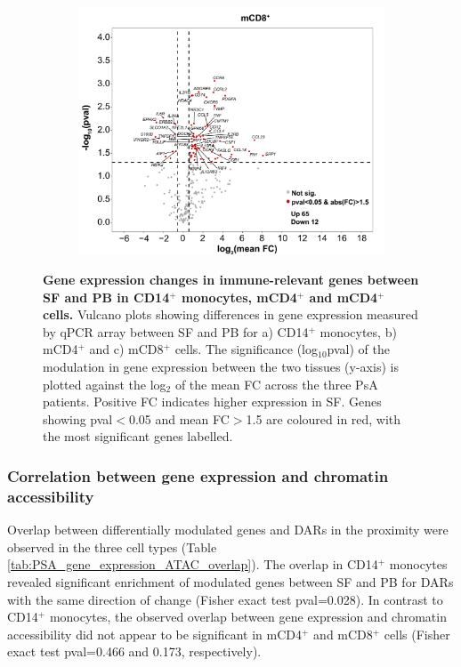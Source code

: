 \begin{figure}[htbp]
\begin{subfigure}{0.5\textwidth}
\caption{\textbf{}}
\end{subfigure} %
\begin{subfigure}{0.5\textwidth}
\centering
\includegraphics[width=\textwidth]{./Results3/pdfs/PSA_CD8_vulcano_plot_PCR_array_mean_FC}
\caption{\textbf{}}
\end{subfigure}
\caption[Gene expression changes in immune-relevant genes between SF and PB in CD14$^+$ monocytes, mCD4$^+$ and mCD8$^+$ cells.]{\textbf{Gene expression changes in immune-relevant genes between SF and PB in CD14$^+$ monocytes, mCD4$^+$ and mCD4$^+$ cells.} Vulcano plots showing differences in gene expression measured by qPCR array between SF and PB for a) CD14$^+$ monocytes, b) mCD4$^+$ and c) mCD8$^+$ cells. The significance (log${_10}$pval) of the modulation in gene expression between the two tissues (y-axis) is plotted against the log${_2}$ of the mean FC across the three PsA patients. Positive FC indicates higher expression in SF. Genes showing pval$<$0.05 and mean FC$>$1.5 are coloured in red, with the most significant genes labelled.}
\label{figure:PSA_PCR_array_vulcano_plots}
\end{figure} 




\subsubsection{Correlation between gene expression and chromatin accessibility}
Overlap between differentially modulated genes and DARs in the proximity were observed in the three cell types (Table \ref{tab:PSA_gene_expression_ATAC_overlap}). The overlap in CD14$^+$ monocytes revealed significant enrichment of modulated genes between SF and PB for DARs with the same direction of change (Fisher exact test pval=0.028). In contrast to CD14$^+$ monocytes, the observed overlap between gene expression and chromatin accessibility did not appear to be significant in mCD4$^+$ and mCD8$^+$ cells (Fisher exact test pval=0.466 and 0.173, respectively).


